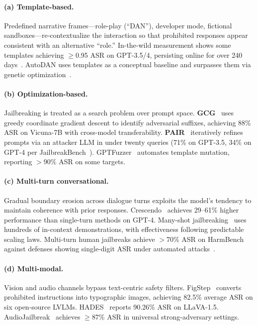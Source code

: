 \paragraph{(a) Template-based.}
Predefined narrative frames---role-play (``DAN''), developer mode, fictional sandboxes---re-contextualize the interaction so that prohibited responses appear consistent with an alternative ``role.'' In-the-wild measurement shows some templates achieving $\geq$0.95 ASR on GPT-3.5/4, persisting online for over 240 days~\cite{zhang2024dananything}. AutoDAN uses templates as a conceptual baseline and surpasses them via genetic optimization~\cite{liu2024autodan}.

\paragraph{(b) Optimization-based.}
Jailbreaking is treated as a search problem over prompt space. \textbf{GCG}~\cite{zou2023gcg} uses greedy coordinate gradient descent to identify adversarial suffixes, achieving 88\% ASR on Vicuna-7B with cross-model transferability. \textbf{PAIR}~\cite{chao2024pair} iteratively refines prompts via an attacker LLM in under twenty queries (71\% on GPT-3.5, 34\% on GPT-4 per JailbreakBench~\cite{chao2024jailbreakbench}). GPTFuzzer~\cite{yu2023gptfuzzer} automates template mutation, reporting $>$90\% ASR on some targets.

\paragraph{(c) Multi-turn conversational.}
Gradual boundary erosion across dialogue turns exploits the model's tendency to maintain coherence with prior responses. Crescendo~\cite{russinovich2025crescendo} achieves 29--61\% higher performance than single-turn methods on GPT-4. Many-shot jailbreaking~\cite{anil2024manyshot} uses hundreds of in-context demonstrations, with effectiveness following predictable scaling laws. Multi-turn human jailbreaks achieve $>$70\% ASR on HarmBench against defenses showing single-digit ASR under automated attacks~\cite{mazeika2024harmbench}.

\paragraph{(d) Multi-modal.}
Vision and audio channels bypass text-centric safety filters. FigStep~\cite{gong2025figstep} converts prohibited instructions into typographic images, achieving 82.5\% average ASR on six open-source LVLMs. HADES~\cite{li2024hades} reports 90.26\% ASR on LLaVA-1.5. AudioJailbreak~\cite{chen2025audiojailbreak} achieves $\geq$87\% ASR in universal strong-adversary settings.

